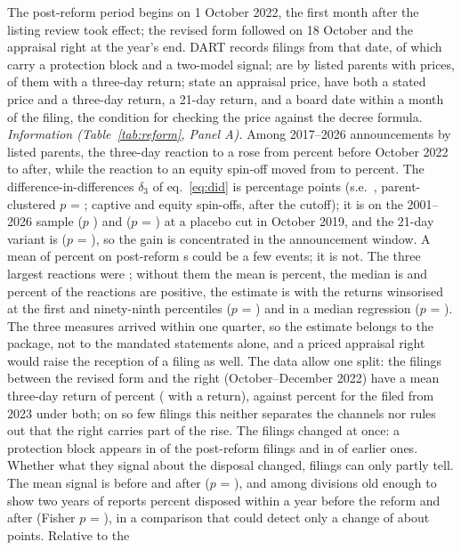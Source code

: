 The post-reform period begins on 1 October 2022, the first month after the listing review took effect; the revised form followed on 18 October and the appraisal right at the year's end. DART records \ProtPostN{} \captive{} filings from that date, of which \ProtPostWithBlock{} carry a protection block and \ProtStrengthN{} a two-model signal; \PostCaptiveListed{} are by listed parents with prices, \PostCaptiveCarN{} of them with a three-day return; \AppraisalPrices{} state an appraisal price, \PutSlopeThreeN{} have both a stated price and a three-day return, \PutSlopeTwentyOneN{} a 21-day return, and \AppraisalProxyN{} a board date within a month of the filing, the condition for checking the price against the decree formula. \emph{Information (Table~\ref{tab:reform}, Panel A).} Among 2017--2026 announcements by listed parents, the three-day reaction to a \captive{} rose from \CarCaptivePre{} percent before October 2022 to \CarCaptivePost{} after, while the reaction to an equity spin-off moved from \CarEquityPre{} to \CarEquityPost{} percent. The difference-in-differences $\delta_3$ of eq.~\eqref{eq:did} is \DiDCxP{} percentage points (s.e.\ \DiDCxPSE{}, parent-clustered $p$ = \DiDCxPP{}; \DiDNCaptive{} captive and \DiDNEquity{} equity spin-offs, \DiDNPost{} after the cutoff); it is \DiDCxPLong{} on the 2001--2026 sample ($p$ \DiDCxPLongP{}) and \DiDPlacebo{} ($p$ = \DiDPlaceboP{}) at a placebo cut in October 2019, and the 21-day variant is \DiDCxPTwentyOne{} ($p$ = \DiDCxPTwentyOneP{}), so the gain is concentrated in the announcement window. A mean of \CarCaptivePost{} percent on \PostCaptiveCarN{} post-reform \captive{}s could be a few events; it is not. The three largest reactions were \DiDTopCars{}; without them the mean is \PostCaptiveCarMeanExTop{} percent, the median is \PostCaptiveCarMedian{} and \PostCaptiveCarSharePos{} percent of the reactions are positive, the estimate is \DiDCxPWins{} with the returns winsorised at the first and ninety-ninth percentiles ($p$ = \DiDCxPWinsP{}) and \DiDCxPMedian{} in a median regression ($p$ = \DiDCxPMedianP{}). The three measures arrived within one quarter, so the estimate belongs to the package, not to the mandated statements alone, and a priced appraisal right would raise the reception of a filing as well. The data allow one split: the \PostQFourEvents{} \captive{} filings between the revised form and the right (October--December 2022) have a mean three-day return of \PostQFourCar{} percent (\PostQFourN{} with a return), against \PostLaterCar{} percent for the \PostLaterN{} filed from 2023 under both; on so few filings this neither separates the channels nor rules out that the right carries part of the rise. The filings changed at once: a protection block appears in \ProtPostWithBlock{} of the \ProtPostN{} post-reform filings and in \ProtPreWithBlock{} of \ProtPreN{} earlier ones. Whether what they signal about the disposal changed, \ProtPostN{} filings can only partly tell. The mean signal is \ScorePre{} before and \ScorePost{} after ($p$ = \ScorePrePostP{}), and among divisions old enough to show two years of reports \EarlyPre{} percent disposed within a year before the reform and \EarlyPost{} after (Fisher $p$ = \EarlyPrePostP{}), in a comparison that could detect only a change of about \MDEEarlyPP{} points. Relative to the 